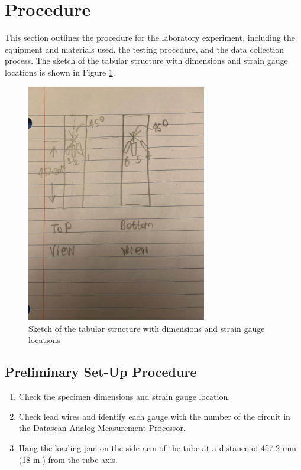 \documentclass[12pt, titlepage]{article}
\begin{document}
\section{Procedure}
This section outlines the procedure for the laboratory experiment, including
the equipment and materials used, the testing procedure, and the data
collection process. The sketch of the tabular structure with dimensions and
strain gauge locations is shown in Figure \ref{fig:sketch}.
\begin{figure}[H]
    \centering
    \includegraphics[width=0.7\textwidth]{./Images/Sketch.jpeg}
    \captionsetup{justification=raggedright,singlelinecheck=false}
    \caption{Sketch of the tabular structure with dimensions and strain gauge locations}
    \label{fig:sketch}
\end{figure}
\subsection{Preliminary Set-Up Procedure}
\begin{enumerate}
    \item Check the specimen dimensions and strain gauge location.
    \item Check lead wires and identify each gauge with the number of the
      circuit in the Datascan Analog Measurement Processor.
    \item Hang the loading pan on the side arm of the tube at a distance of
      457.2 mm (18 in.) from the tube axis.
\end{enumerate}
\end{document}
